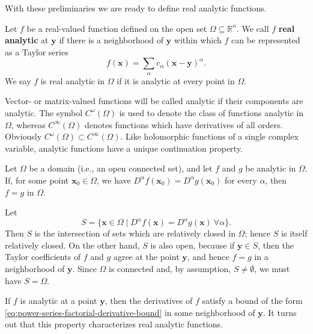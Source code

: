 With these preliminaries we are ready to define real analytic functions.

\begin{Definition}
\label{def:real-analytic-function}
Let $f$ be a real-valued function defined on the open set $\Omega\subseteq\mathbb{R}^n$. We call $f$ \textbf{real analytic} at $\bm{y}$ if there is a neighborhood of $\bm{y}$ within which $f$ can be represented as a Taylor series
\begin{equation}\label{eq:real-analytic-local-taylor-series}
f(\bm{x})=\sum_\alpha c_\alpha(\bm{x}-\bm{y})^\alpha.
\end{equation}
We say $f$ is real analytic in $\Omega$ if it is analytic at every point in $\Omega$.
\end{Definition}

Vector- or matrix-valued functions will be called analytic if their components are analytic. The symbol $C^\omega(\Omega)$ is used to denote the class of functions analytic in $\Omega$, whereas $C^\infty(\Omega)$ denotes functions which have derivatives of all orders. Obviously $C^\omega(\Omega)\subset C^\infty(\Omega)$. Like holomorphic functions of a single complex variable, analytic functions have a unique continuation property.

\begin{Theorem}
\label{thm:real-analytic-unique-continuation}
Let $\Omega$ be a domain (i.e., an open connected set), and let $f$ and $g$ be analytic in $\Omega$. If, for some point $\bm{x}_0\in\Omega$, we have $D^\alpha f(\bm{x}_0)=D^\alpha g(\bm{x}_0)$ for every $\alpha$, then $f=g$ in $\Omega$.
\end{Theorem}

\begin{Proof}
Let
\begin{equation}\label{eq:analytic-identity-derivative-set}
S=\{\bm{x}\in\Omega\mid D^\alpha f(\bm{x})=D^\alpha g(\bm{x})\ \forall\alpha\}.
\end{equation}
Then $S$ is the intersection of sets which are relatively closed in $\Omega$; hence $S$ is itself relatively closed. On the other hand, $S$ is also open, because if $\bm{y}\in S$, then the Taylor coefficients of $f$ and $g$ agree at the point $\bm{y}$, and hence $f=g$ in a neighborhood of $\bm{y}$. Since $\Omega$ is connected and, by assumption, $S\ne\emptyset$, we must have $S=\Omega$.
\end{Proof}

If $f$ is analytic at a point $\bm{y}$, then the derivatives of $f$ satisfy a bound of the form \eqref{eq:power-series-factorial-derivative-bound} in some neighborhood of $\bm{y}$. It turns out that this property characterizes real analytic functions.

